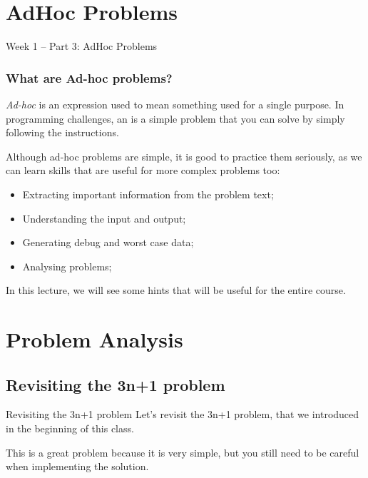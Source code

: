 

\section{AdHoc Problems}

\begin{frame}
  \centering
  {\huge
    Week 1 -- Part 3: AdHoc Problems
  }
\end{frame}

\begin{frame}
  \frametitle{What are Ad-hoc problems?}

  \emph{Ad-hoc} is an expression used to mean something used for a single purpose. In programming challenges, an  is a simple problem that you can solve by simply following the instructions.
  \bigskip

  Although ad-hoc problems are simple, it is good to practice them seriously, as we can learn skills that are useful for more complex problems too:
  \bigskip

  \begin{itemize}
    \item Extracting important information from the problem text;
    \item Understanding the input and output;
    \item Generating debug and worst case data;
    \item Analysing problems;
  \end{itemize}
  \bigskip

  In this lecture, we will see some hints that will be useful for the
  entire course.
\end{frame}

\section{Problem Analysis}
\subsection{Revisiting the 3n+1 problem}
\begin{frame}{Revisiting the 3n+1 problem}
  Let's revisit the 3n+1 problem, that we introduced in the beginning of this class.
  \bigskip

  This is a great problem because it is very simple, but you still need to be careful when implementing the solution.
\end{frame}

